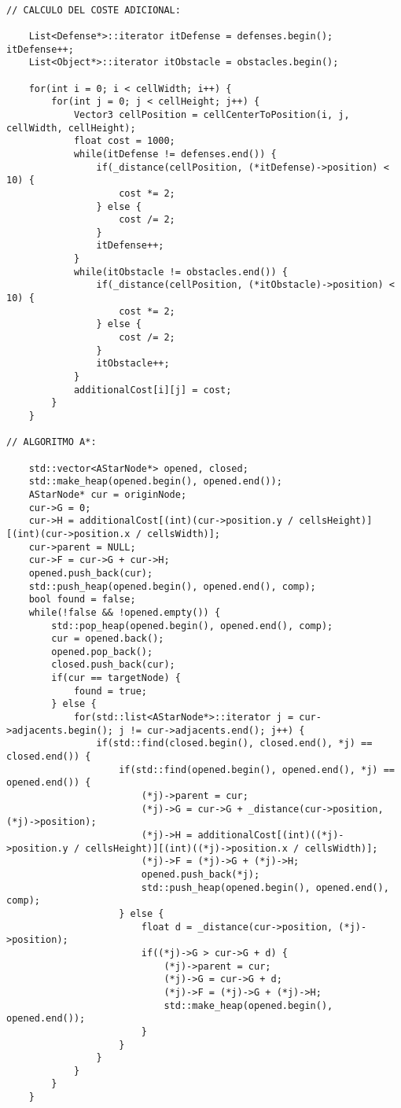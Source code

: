 \begin{lstlisting}

// CALCULO DEL COSTE ADICIONAL:

    List<Defense*>::iterator itDefense = defenses.begin(); itDefense++;
    List<Object*>::iterator itObstacle = obstacles.begin();

    for(int i = 0; i < cellWidth; i++) {
        for(int j = 0; j < cellHeight; j++) {
            Vector3 cellPosition = cellCenterToPosition(i, j, cellWidth, cellHeight);
            float cost = 1000;
            while(itDefense != defenses.end()) {
                if(_distance(cellPosition, (*itDefense)->position) < 10) {
                    cost *= 2;
                } else {
                    cost /= 2;
                }
                itDefense++;
            }
            while(itObstacle != obstacles.end()) {
                if(_distance(cellPosition, (*itObstacle)->position) < 10) {
                    cost *= 2;
                } else {
                    cost /= 2;
                }
                itObstacle++;
            }
            additionalCost[i][j] = cost;
        }
    }

// ALGORITMO A*:

    std::vector<AStarNode*> opened, closed;
    std::make_heap(opened.begin(), opened.end());
    AStarNode* cur = originNode;
    cur->G = 0;
	cur->H = additionalCost[(int)(cur->position.y / cellsHeight)][(int)(cur->position.x / cellsWidth)];
	cur->parent = NULL;
	cur->F = cur->G + cur->H;
    opened.push_back(cur);
    std::push_heap(opened.begin(), opened.end(), comp);
    bool found = false;
    while(!false && !opened.empty()) {
        std::pop_heap(opened.begin(), opened.end(), comp);
        cur = opened.back();
        opened.pop_back();
        closed.push_back(cur);
        if(cur == targetNode) {
            found = true;
        } else {
            for(std::list<AStarNode*>::iterator j = cur->adjacents.begin(); j != cur->adjacents.end(); j++) {
                if(std::find(closed.begin(), closed.end(), *j) == closed.end()) {
                    if(std::find(opened.begin(), opened.end(), *j) == opened.end()) {
                        (*j)->parent = cur;
                        (*j)->G = cur->G + _distance(cur->position, (*j)->position);
                        (*j)->H = additionalCost[(int)((*j)->position.y / cellsHeight)][(int)((*j)->position.x / cellsWidth)];
                        (*j)->F = (*j)->G + (*j)->H;
                        opened.push_back(*j);
                        std::push_heap(opened.begin(), opened.end(), comp);
                    } else {
                        float d = _distance(cur->position, (*j)->position);
                        if((*j)->G > cur->G + d) {
                            (*j)->parent = cur;
							(*j)->G = cur->G + d;
							(*j)->F = (*j)->G + (*j)->H;
                            std::make_heap(opened.begin(), opened.end());
                        }
                    }
                }
            }
        }
    }


\end{lstlisting}

